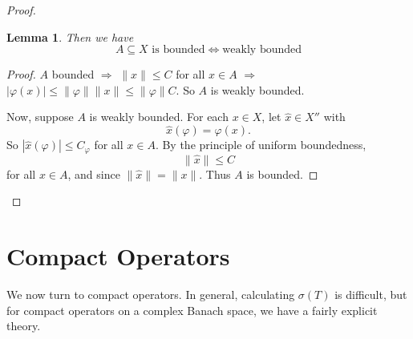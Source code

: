\documentclass[10pt, oneside, reqno]{amsbook}
\theoremstyle{plain}%
\newtheorem{lem}[thm]{Lemma}
\theoremstyle{definition}
\theoremstyle{remark}
\renewcommand{\phi}{\varphi}
\begin{document}
\begin{proof}
\begin{lem}
    Then we have \[
        \text{$A \subseteq X$ is bounded}  \iff \text{weakly bounded}
    \]
\end{lem}
\begin{proof}
    $A$ bounded $\Rightarrow$ $\| x \| \leq C$ for all $x \in A$ $\Rightarrow$ $|\phi(x)| \leq \| \phi \| \| x \| \leq \|\phi \| C$.  So $A$ is weakly bounded.
    
    Now, suppose $A$ is weakly bounded.  For each $x \in X$, let $\hat x \in X''$ with \[
        \hat x(\phi) = \phi(x).
    \]  So $| \hat x(\phi) | \leq C_\phi$ for all $x \in A$.  By the principle of uniform boundedness, \[
        \| \hat x \| \leq C
    \] for all $x \in A$, and since $\| \hat x \| = \| x \|$.  Thus $A$ is bounded.  
\end{proof}
\end{proof}  

\chapter{Compact Operators}

We now turn to compact operators.  In general, calculating $\sigma(T)$ is difficult, but for compact operators on a complex Banach space, we have a fairly explicit theory.
\end{document}
